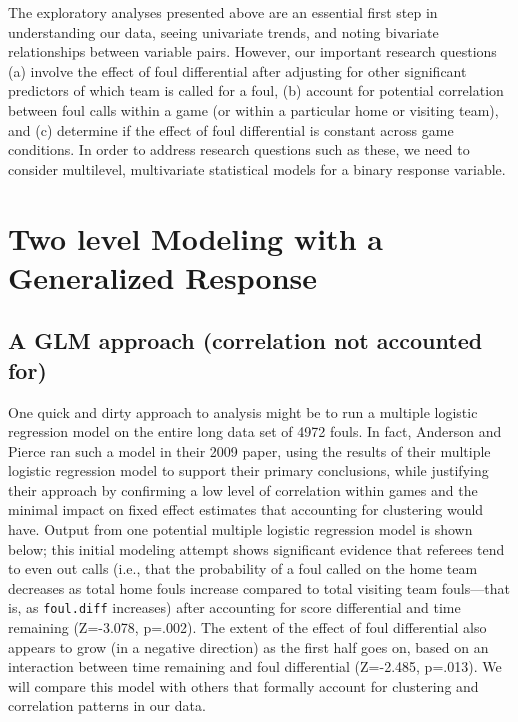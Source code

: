 \documentclass[
]{krantz}
\begin{document}
The exploratory analyses presented above are an essential first step in understanding our data, seeing univariate trends, and noting bivariate relationships between variable pairs. However, our important research questions (a) involve the effect of foul differential after adjusting for other significant predictors of which team is called for a foul, (b) account for potential correlation between foul calls within a game (or within a particular home or visiting team), and (c) determine if the effect of foul differential is constant across game conditions. In order to address research questions such as these, we need to consider multilevel, multivariate statistical models for a binary response variable.

\hypertarget{twolevelmodeling-glmm}{%
\section{Two level Modeling with a Generalized Response}\label{twolevelmodeling-glmm}}

\hypertarget{multregr-glmm}{%
\subsection{A GLM approach (correlation not accounted for)}\label{multregr-glmm}}

One quick and dirty approach to analysis might be to run a multiple logistic regression model on the entire long data set of 4972 fouls. In fact, Anderson and Pierce ran such a model in their 2009 paper, using the results of their multiple logistic regression model to support their primary conclusions, while justifying their approach by confirming a low level of correlation within games and the minimal impact on fixed effect estimates that accounting for clustering would have. Output from one potential multiple logistic regression model is shown below; this initial modeling attempt shows significant evidence that referees tend to even out calls (i.e., that the probability of a foul called on the home team decreases as total home fouls increase compared to total visiting team fouls---that is, as \texttt{foul.diff} increases) after accounting for score differential and time remaining (Z=-3.078, p=.002). The extent of the effect of foul differential also appears to grow (in a negative direction) as the first half goes on, based on an interaction between time remaining and foul differential (Z=-2.485, p=.013). We will compare this model with others that formally account for clustering and correlation patterns in our data.
\end{document}
